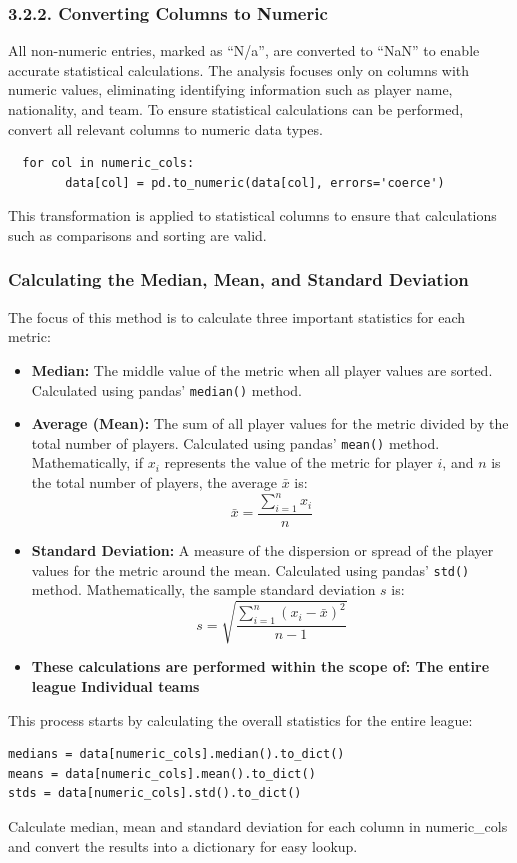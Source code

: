 \documentclass[a4paper,12pt]{article}
\begin{document}
\subsubsection*{\textbf{3.2.2. Converting Columns to Numeric}}
All non-numeric entries, marked as “N/a”, are converted to “NaN” to enable accurate statistical calculations. The analysis focuses only on columns with numeric values, eliminating identifying information such as player name, nationality, and team. To ensure statistical calculations can be performed, convert all relevant columns to numeric data types.
\begin{mdframed}
\begin{verbatim}
  for col in numeric_cols:
        data[col] = pd.to_numeric(data[col], errors='coerce')
\end{verbatim}
\end{mdframed}
This transformation is applied to statistical columns to ensure that calculations such as comparisons and sorting are valid.

\subsubsection*{\textbf{ Calculating the Median, Mean, and Standard Deviation
}}
The focus of this method is to calculate three important statistics for each metric:
\begin{itemize}
    \item \textbf{Median:} The middle value of the metric when all player values are sorted. Calculated using pandas' \texttt{median()} method.
    \item \textbf{Average (Mean):} The sum of all player values for the metric divided by the total number of players. Calculated using pandas' \texttt{mean()} method. Mathematically, if $x_i$ represents the value of the metric for player $i$, and $n$ is the total number of players, the average $\bar{x}$ is:
    $$ \bar{x} = \frac{\sum_{i=1}^{n} x_i}{n} $$
    \item \textbf{Standard Deviation:} A measure of the dispersion or spread of the player values for the metric around the mean. Calculated using pandas' \texttt{std()} method. Mathematically, the sample standard deviation $s$ is:
    $$ s = \sqrt{\frac{\sum_{i=1}^{n} (x_i - \bar{x})^2}{n-1}} $$
    \item \textbf{These calculations are performed within the scope of:
    The entire league
    Individual teams
    }     
\end{itemize}
This process starts by calculating the overall statistics for the entire league:
\begin{mdframed}
\begin{verbatim}
medians = data[numeric_cols].median().to_dict()
means = data[numeric_cols].mean().to_dict()
stds = data[numeric_cols].std().to_dict()
\end{verbatim}
\end{mdframed}
Calculate median, mean and standard deviation for each column in numeric\_cols and convert the results into a dictionary for easy lookup.
\end{document}
